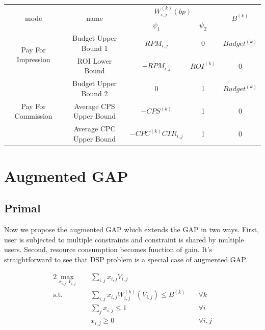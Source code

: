 \documentclass[sigconf]{acmart}
\newcommand{\sumj}{\sum\limits_j}
\newcommand{\sumij}{\sum\limits_{i,j}}
\newcommand{\sx}{x_{i,j}}
\newcommand{\sV}{V_{i,j}}
\newcommand{\sW}{W_{i,j}^{(k)}}
\newcommand{\sB}{B^{(k)}}
\newcommand{\sRPM}{RPM_{i,j}}
\newcommand{\pprob}{\psi_1}
\newcommand{\pprice}{\psi_2}
\newcommand{\agapresourceconstraint}{\sumij \sx \sW(\sV) \le \sB}
\newcommand{\assignmentconstraint}{\sumj \sx \le 1}
\begin{document}
\begin{center}
\begin{tabular}{|c|c|c|c|c|}
\hline
\multirow{2}{*}{mode}               & \multirow{2}{*}{name}   & \multicolumn{2}{c|}{$\sW(bp)$}                      & \multirow{2}{*}{$\sB$} \\
\cline{3-4}
                                    &                         & $\pprob$                 & $\pprice$                & \\
\hline
\multirow{2}{*}{Pay For Impression} & Budget Upper Bound 1    & $\sRPM$              & 0                        & $Budget^{(k)}$ \\
\cline{2-5}
                                    & ROI Lower Bound         & $-\sRPM$             & $ROI^{(k)}$              & 0 \\
\hline
\multirow{3}{*}{Pay For Commission} & Budget Upper Bound 2    & 0                        & 1                        & $Budget^{(k)}$ \\
\cline{2-5}
                                    & Average CPS Upper Bound & $-CPS^{(k)}$             & 1                        & 0 \\
\cline{2-5}
                                    & Average CPC Upper Bound & $-CPC^{(k)}CTR_{i,j}$    & 1                        & 0 \\
\hline
\end{tabular}
\end{center}

\newpage
\section{Augmented GAP}

\subsection{Primal}

Now we propose the augmented GAP which extends the GAP in two ways.
First, user is subjected to multiple constraints and constraint is shared by multiple users.
Second, resource consumption becomes function of gain.
It's straightforward to see that DSP problem is a special case of augmented GAP.

\begin{alignat}{2}
    \max\limits_{\sx, \sV} \quad & \sumij \sx \sV \quad              & {} \\
    \mbox{s.t.} \quad            & \agapresourceconstraint \quad     & \forall k \\
    \quad                        & \assignmentconstraint \quad       & \forall i \\
    \quad                        & \sx \ge 0 \quad                   & \forall i,j
\end{alignat}
\end{document}
